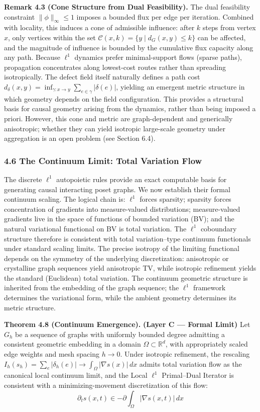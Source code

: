 \documentclass[
]{article}
\begin{document}
\textbf{Remark 4.3 (Cone Structure from Dual Feasibility).} The dual
feasibility constraint \(\|\phi\|_\infty \le 1\) imposes a bounded flux
per edge per iteration. Combined with locality, this induces a cone of
admissible influence: after \(k\) steps from vertex \(x\), only vertices
within the set \(\mathcal{C}(x,k) = \{ y \mid d_G(x,y) \le k \}\) can be
affected, and the magnitude of influence is bounded by the cumulative
flux capacity along any path. Because \(\ell^1\) dynamics prefer
minimal-support flows (sparse paths), propagation concentrates along
lowest-cost routes rather than spreading isotropically. The defect field
itself naturally defines a path cost
\(d_\delta(x,y) = \inf_{\gamma: x \to y} \sum_{e \in \gamma} |\delta(e)|\),
yielding an emergent metric structure in which geometry depends on the
field configuration. This provides a structural basis for causal
geometry arising from the dynamics, rather than being imposed a priori.
However, this cone and metric are graph-dependent and generically
anisotropic; whether they can yield isotropic large-scale geometry under
aggregation is an open problem (see Section 6.4).

\subsubsection{4.6 The Continuum Limit: Total Variation
Flow}\label{the-continuum-limit-total-variation-flow}

The discrete \(\ell^1\) autopoietic rules provide an exact computable
basis for generating causal interacting poset graphs. We now establish
their formal continuum scaling. The logical chain is: \(\ell^1\) forces
sparsity; sparsity forces concentration of gradients into measure-valued
distributions; measure-valued gradients live in the space of functions
of bounded variation (BV); and the natural variational functional on BV
is total variation. The \(\ell^1\) coboundary structure therefore is
consistent with total variation--type continuum functionals under
standard scaling limits. The precise isotropy of the limiting functional
depends on the symmetry of the underlying discretization: anisotropic or
crystalline graph sequences yield anisotropic TV, while isotropic
refinement yields the standard (Euclidean) total variation. The
continuum geometric structure is inherited from the embedding of the
graph sequence; the \(\ell^1\) framework determines the variational
form, while the ambient geometry determines its metric structure.

\textbf{Theorem 4.8 (Continuum Emergence).} \textbf{(Layer C --- Formal
Limit)} Let \(G_h\) be a sequence of graphs with uniformly bounded
degree admitting a consistent geometric embedding in a domain
\(\Omega \subset \mathbb{R}^d\), with appropriately scaled edge weights
and mesh spacing \(h \to 0\). Under isotropic refinement, the rescaling
\(I_h(s_h) = \sum_e |\delta_h(e)| \to \int_\Omega |\nabla s(x)| \, dx\)
admits total variation flow as the canonical local continuum limit, and
the Local \(\ell^1\) Primal--Dual Iterator is consistent with a
minimizing-movement discretization of this flow:
\[ \partial_t s(x,t) \in -\partial \int_\Omega |\nabla s(x,t)| \, dx \]
\end{document}
